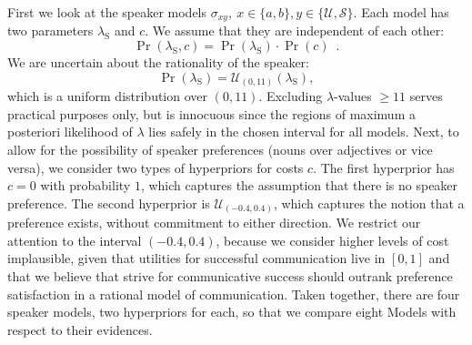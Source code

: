 First we look at the speaker models $\sigma_{xy},\
x\in\{a,b\},y\in\{\mathcal{U},\mathcal{S}\}$. Each model has two
parameters $\lambda_\mathrm{S}$ and $c$. We assume that they are
independent of each other:
\begin{equation}\label{hyper-speaker-independent}
\Pr(\lambda_\mathrm{S},c)=\Pr(\lambda_\mathrm{S}) \cdot \Pr(c) \enspace .
\end{equation}
We are uncertain about the rationality of the speaker:
\begin{equation}\label{hyper-speaker-lambda}
\Pr(\lambda_\mathrm{S})= \mathcal{U}_{(0,11)}(\lambda_\mathrm{S}),
\end{equation}
which is a uniform distribution over $(0,11)$. Excluding
$\lambda$-values $\ge 11$ serves practical purposes only, but is
innocuous since the regions of maximum a posteriori likelihood of
$\lambda$ lies safely in the chosen interval for all models. Next, to
allow for the possibility of speaker preferences (nouns over
adjectives or vice versa), we consider two types of hyperpriors for
costs $c$. The first hyperprior has $c=0$ with probability $1$, which
captures the assumption that there is no speaker preference. The
second hyperprior is $\mathcal{U}_{(-0.4,0.4)}$, which captures the
notion that a preference exists, without commitment to either
direction. We restrict our attention to the interval $(-0.4,0.4)$,
because we consider higher levels of cost implausible, given that
utilities for successful communication live in $[0,1]$ and that we
believe that strive for communicative success should outrank
preference satisfaction in a rational model of communication. Taken
together, there are four speaker models, two hyperpriors for each, so
that we compare eight Models with respect to their evidences.

